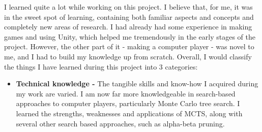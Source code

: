 I learned quite a lot while working on this project. I believe that, for me, it was in the sweet spot of learning, containing both familiar aspects and concepts and completely new areas of research. I had already had some experience in making games and using Unity, which helped me tremendously in the early stages of the project. However, the other part of it - making a computer player - was novel to me, and I had to build my knowledge up from scratch. Overall, I would classify the things I have learned during this project into 3 categories:
\begin{itemize}
\item \textbf{Technical knowledge - } The tangible skills and know-how I acquired during my work are varied. I am now far more knowledgeable in search-based approaches to computer players, particularly Monte Carlo tree search. I learned the strengths, weaknesses and applications of MCTS, along with several other search based approaches, such as alpha-beta pruning.


\end{itemize}
